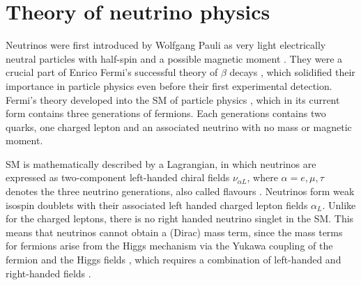 \chapter{Theory of neutrino physics}\label{sec:NeutrinoTheory}

Neutrinos were first introduced by Wolfgang Pauli \cite{PauliNeutrinoProposalLetter.pdf,TheIdeaOfTheNeutrino.pdf} as very light electrically neutral particles with half-spin and a possible magnetic moment \cite{NeutrinoMagMomentImplications1934.pdf}. They were a crucial part of Enrico Fermi's successful theory of $\beta$ decays \cite{FermisTheoryOfBetaDecayOriginal.pdf, FermisTheoryOfBetaDecay.pdf}, which solidified their importance in particle physics even before their first experimental detection.
Fermi's theory developed into the \gls{SM} of particle physics \cite{SMGlashow.pdf,SMWeinberg.pdf,SMSalam.pdf}, which in its current form contains three generations of fermions. Each generations contains two quarks, one charged lepton and an associated neutrino with no mass or magnetic moment. 

\gls{SM} is mathematically described by a Lagrangian, in which neutrinos are expressed as two-component left-handed chiral fields $\nu_{\alpha L}$, where $\alpha=e,\mu,\tau$ denotes the three neutrino generations, also called flavours \cite{LandauParityViolationForNus.pdf, LeeYangNuAsMasslessWeylSpinor.pdf, SalamNuAsMasslessWeylSpinors.pdf}. Neutrinos form weak isospin doublets with their associated left handed charged lepton fields $\alpha_L$. Unlike for the charged leptons, there is no right handed neutrino singlet in the \gls{SM}. This means that neutrinos cannot obtain a (Dirac) mass term, since the mass terms for fermions arise from the Higgs mechanism \cite{HiggsMechanismOriginal1964.pdf, HiggMechanismEnglertBrut1964.pdf, HiggsMechanismGuralnikHagenKibble1964.pdf} via the Yukawa coupling of the fermion and the Higgs fields \cite{YukawaLagrangiaWeinberg1967.pdf}, which requires a combination of left-handed and right-handed fields \cite{FundamentalsOfNeutrinoPhysics.pdf}.


